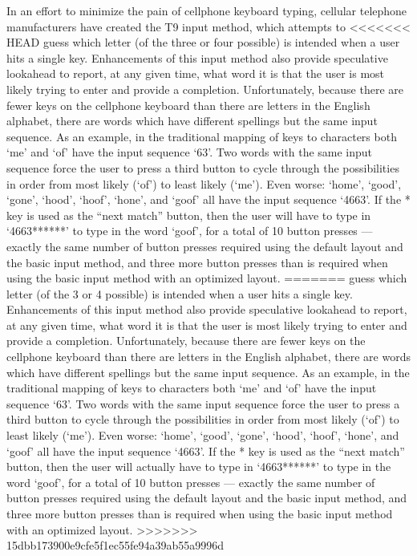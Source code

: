 \documentclass[runningheads]{llncs}
\begin{document}
\begin{prob}[{\sc
MinimumKeystrokes}]
In an effort to minimize the pain of cellphone keyboard typing, cellular
telephone manufacturers have created the T9 input method, which attempts to
<<<<<<< HEAD
guess which letter (of the three or four possible) is intended when a user hits
a single key.  Enhancements of this input method also provide speculative
lookahead to report, at any given time, what word it is that the user is most
likely trying to enter and provide a completion.  Unfortunately, because there
are fewer keys on the cellphone keyboard than there are letters in the English
alphabet, there are words which have different spellings but the same input
sequence.  As an example, in the traditional mapping of keys to characters both
`me' and `of' have the input sequence `63'.  Two words with the same input
sequence force the user to press a third button to cycle through the
possibilities in order from most likely (`of') to least likely (`me').  Even
worse: `home', `good', `gone', `hood', `hoof', `hone', and `goof' all have the
input sequence `4663'.  If the * key is used as the ``next match'' button, then
the user will have to type in `4663******' to type in the word `goof',
for a total of 10 button presses --- exactly the same number of button presses
required using the default layout and the basic input method, and three more
button presses than is required when using the basic input method with an
optimized layout.
=======
guess which letter (of the 3 or 4 possible) is intended when a user hits a
single key.  Enhancements of this input method also provide
speculative lookahead to report, at any given time, what word it is
that the user is most likely trying to enter and provide a completion.
Unfortunately, because there are fewer keys on the cellphone keyboard than
there are letters in the English alphabet, there are words which have different
spellings but the same input sequence.  As an example, in the traditional
mapping of keys to characters both `me' and `of' have the input sequence
`63'.  Two words with the same input sequence force the user to press a third
button to cycle through the possibilities in order from most likely (`of') to
least likely (`me').  Even worse: `home', `good', `gone', `hood',
`hoof', `hone', and `goof' all have the input sequence `4663'.  If
the * key is used as the ``next match'' button, then the user will actually
have to type in `4663******' to type in the word `goof', for a total of 10
button presses --- exactly the same number of button presses required using the
default layout and the basic input method, and three more button presses than
is required when using the basic input method with an optimized layout.
>>>>>>> 15dbb173900e9cfe5f1ec55fe94a39ab55a9996d


\end{prob}
\end{document}

